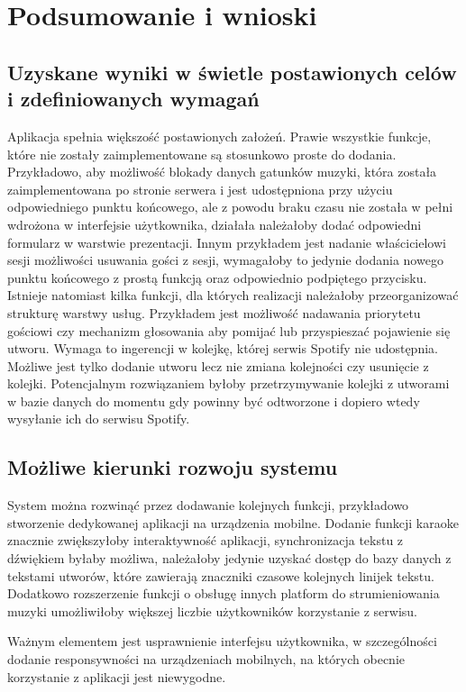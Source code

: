 \chapter{Podsumowanie i wnioski}
\section{Uzyskane wyniki w świetle postawionych celów i zdefiniowanych wymagań}
Aplikacja spełnia większość postawionych założeń. Prawie wszystkie funkcje, które nie zostały zaimplementowane są stosunkowo proste do dodania. Przykładowo, aby możliwość blokady danych gatunków muzyki, która została zaimplementowana po stronie serwera i jest udostępniona przy użyciu odpowiedniego punktu końcowego, ale z powodu braku czasu nie została w pełni wdrożona w interfejsie użytkownika, działała należałoby dodać odpowiedni formularz w warstwie prezentacji. Innym przykładem jest nadanie właścicielowi sesji możliwości usuwania gości z sesji, wymagałoby to jedynie dodania nowego punktu końcowego z prostą funkcją oraz odpowiednio podpiętego przycisku. Istnieje natomiast kilka funkcji, dla których realizacji należałoby przeorganizować strukturę warstwy usług. Przykładem jest możliwość nadawania priorytetu gościowi czy mechanizm głosowania aby pomijać lub przyspieszać pojawienie się utworu. Wymaga to ingerencji w kolejkę, której serwis Spotify nie udostępnia. Możliwe jest tylko dodanie utworu lecz nie zmiana kolejności czy usunięcie z kolejki. Potencjalnym rozwiązaniem byłoby przetrzymywanie kolejki z utworami w bazie danych do momentu gdy powinny być odtworzone i dopiero wtedy wysyłanie ich do serwisu Spotify.

\section{Możliwe kierunki rozwoju systemu}
System można rozwinąć przez dodawanie kolejnych funkcji, przykładowo stworzenie dedykowanej aplikacji na urządzenia mobilne. Dodanie funkcji karaoke znacznie zwiększyłoby interaktywność aplikacji, synchronizacja tekstu z dźwiękiem byłaby możliwa, należałoby jedynie uzyskać dostęp do bazy danych z tekstami utworów, które zawierają znaczniki czasowe kolejnych linijek tekstu. Dodatkowo rozszerzenie funkcji o obsługę innych platform do strumieniowania muzyki umożliwiłoby większej liczbie użytkowników korzystanie z serwisu. 

Ważnym elementem jest usprawnienie interfejsu użytkownika, w szczególności dodanie responsywności na urządzeniach mobilnych, na których obecnie korzystanie z aplikacji jest niewygodne.

